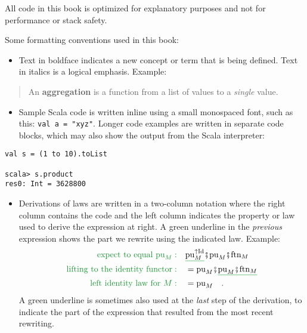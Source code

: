 All code in this book is optimized for explanatory purposes and not
for performance or stack safety.

Some formatting conventions used in this book:
\begin{itemize}
\item Text in boldface indicates a new concept or term that is being defined.
Text in italics is a logical emphasis. Example:
\end{itemize}
\begin{quotation}
An \textbf{aggregation} is a function from a list
of values to a \emph{single} value.
\end{quotation}
\begin{itemize}
\item Sample Scala code is written inline using a small monospaced font,
such as this: \lstinline!val a = "xyz"!. Longer code examples are
written in separate code blocks, which may also show the output from
the Scala interpreter:
\end{itemize}
\begin{lstlisting}
val s = (1 to 10).toList

scala> s.product
res0: Int = 3628800 
\end{lstlisting}

\begin{itemize}
\item Derivations of laws are written in a two-column notation where the
right column contains the code and the left column indicates the property
or law used to derive the expression at right. A green underline in
the \emph{previous} expression shows the part we rewrite using the
indicated law. Example: 
\begin{align*}
{\color{greenunder}\text{expect to equal }\text{pu}_{M}:}\quad & \gunderline{\text{pu}_{M}^{\uparrow\text{Id}}}\bef\text{pu}_{M}\bef\text{ftn}_{M}\\
{\color{greenunder}\text{lifting to the identity functor}:}\quad & =\text{pu}_{M}\bef\gunderline{\text{pu}_{M}\bef\text{ftn}_{M}}\\
{\color{greenunder}\text{left identity law for }M:}\quad & =\text{pu}_{M}\quad.
\end{align*}
A green underline is sometimes also used at the \emph{last} step of
the derivation, to indicate the part of the expression that resulted
from the most recent rewriting.
\end{itemize}

